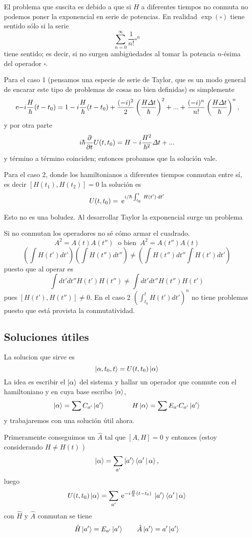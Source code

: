 \documentclass[10pt,oneside]{CBFT_book}
\begin{document}
El problema que suscita es debido a que si $H$ a diferentes tiempos no conmuta
no podemos poner la exponencial en serie de potencias. 
En realidad $\exp({\square})$ tiene sentido sólo si la serie 
\[
	\sum_{n=0}^{\infty}  \frac{1}{n!}\square^n
\]
tiene sentido; es decir, si no surgen ambigüedades al tomar la potencia $n$-ésima
del operador $\square$.

Para el caso 1 (pensamos una especie de serie de Taylor, que es un modo general
de encarar este tipo de problemas de cosas no bien definidas) es simplemente 
\[
	\:\mathrm{e}{-i\frac{H}{\hbar}(t-t_0)} = 1 - i\frac{H}{\hbar}(t - t_0) + 
	\frac{(-i)^2}{2}\left( \frac{H \Delta t }{\hbar} \right)^2 + ... +
	\frac{(-i)^n}{n!} \left( \frac{ H\Delta t }{ \hbar } \right)^n,
\]
y por otra parte
\[
	i \hbar \frac{\partial^{\hspace{-0.05em}} {}}{\partial {t}^{\hspace{-0.05em}}}U(t,t_0) = H - i \frac{H^2}{\hbar^2} \Delta t + ...
\]
y término a término coinciden; entonces probamos que la solución vale.

Para el caso 2, donde los hamiltonianos a diferentes tiempos conmutan entre
sí, es decir $ [ H(t_1), H(t_2) ] = 0 $ la solución es
\[
	U(t,t_0) = \:\mathrm{e}^{ i/\hbar \int_{t_0}^t \: H(t') \: dt' }
\]

Esto no es una boludez. Al desarrollar Taylor la exponencial surge un problema

Si no conmutan los operadores no sé cómo armar el cuadrado.
\[
	A^2 = A(t)A(t'') \; \text{ o bien } \: A^2 = A(t'')A(t)
\]
\[
	\left( \int H(t') dt' \right)\left( \int H(t'') dt'' \right) \neq 
	\left( \int H(t'') dt'' \int H(t') dt' \right)
\]
puesto que al operar es 
\[
	\int dt' dt'' H(t')H(t'') \neq \int dt' dt'' H(t'') H(t') 
\]
pues $[H(t'),H(t'')]\neq 0$.
En el caso 2 $(\int_{t_0}^t H(t')dt' )^n$ no tiene problemas puesto que está 
provista la conmutatividad.

\subsection{Soluciones útiles}

La solucion que sirve es
\[
	\Ket{\alpha,t_0,t} = U(t,t_0)\Ket{\alpha}
\]
La idea es escribir el $\Ket{\alpha}$ del sistema y hallar un operador que conmute
con el hamiltoniano y en cuya base escribo $\Ket{\alpha}$,
\[
	\Ket{\alpha} = \sum C_{a'} \Ket{a'}
	\qquad \qquad 
	H \Ket{\alpha} = \sum E_{a'} C_{a'} \Ket{a'}
\]
y trabajaremos con una solución útil ahora.

Primeramente conseguimos un $\hat{A}$ tal que $[ A, H ]=0$ y entonces (estoy 
considerando $ H \neq H(t)$ )
\[
	\Ket{\alpha} = \sum_{a'} \Ket{a'}\Braket{\alpha'|\alpha},
\]
luego 
\[
	U(t,t_0)\Ket{\alpha} = \sum_{a'} \:\mathrm{e}^{-i\frac{\hat{H}}{\hbar}(t-t_0)}
	\: \Ket{a'}\Braket{\alpha'|\alpha}
\]
con $\hat{H}$ y $\hat{A}$ conmutan se tiene
\[
	\hat{H}\Ket{a'}=E_{a'}\Ket{a'} \qquad \hat{A}\Ket{a'}= a'\Ket{a'}
\]
\end{document}
